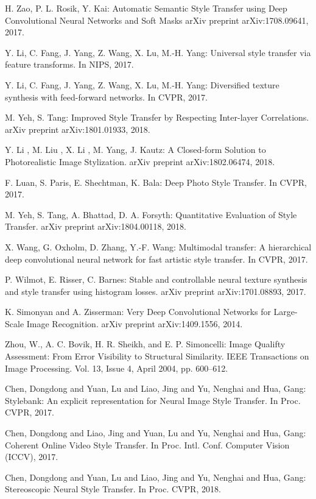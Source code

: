\documentclass{llncs}
\begin{document}
\begin{thebibliography}{5}
H. Zao, P. L. Rosik, Y. Kai:
Automatic Semantic Style Transfer using Deep Convolutional Neural Networks and Soft Masks
arXiv preprint arXiv:1708.09641, 2017.

Y. Li, C. Fang, J. Yang, Z. Wang, X. Lu, M.-H. Yang:
Universal style transfer via feature transforms.
In NIPS, 2017.

Y. Li, C. Fang, J. Yang, Z. Wang, X. Lu, M.-H. Yang:
Diversified texture synthesis with feed-forward networks.
In CVPR, 2017.

M. Yeh, S. Tang:
Improved Style Transfer by Respecting Inter-layer Correlations.
arXiv preprint arXiv:1801.01933, 2018.

Y. Li , M. Liu , X. Li , M. Yang, J. Kautz:
A Closed-form Solution to Photorealistic Image Stylization.
arXiv preprint arXiv:1802.06474, 2018.

F. Luan, S. Paris, E. Shechtman, K. Bala:
Deep Photo Style Transfer.
In CVPR, 2017.

M. Yeh, S. Tang, A. Bhattad, D. A. Forsyth:
Quantitative Evaluation of Style Transfer.
arXiv preprint arXiv:1804.00118, 2018.

 X. Wang, G. Oxholm, D. Zhang, Y.-F. Wang:
Multimodal transfer: A hierarchical deep convolutional neural network for fast artistic style transfer.
In CVPR, 2017.

 P. Wilmot, E. Risser, C. Barnes:
Stable and controllable neural texture synthesis and style transfer using histogram losses.
arXiv preprint arXiv:1701.08893, 2017.

 K. Simonyan and A. Zisserman:
Very Deep Convolutional Networks for Large-Scale Image Recognition.
arXiv preprint arXiv:1409.1556, 2014.

 Zhou, W., A. C. Bovik, H. R. Sheikh, and E. P. Simoncelli: 
Image Qualifty Assessment: From Error Visibility to Structural Similarity.
IEEE Transactions on Image Processing. Vol. 13, Issue 4, April 2004, pp. 600–612.

 Chen, Dongdong and Yuan, Lu and Liao, Jing and Yu, Nenghai and Hua, Gang: Stylebank: An explicit representation for Neural Image Style Transfer. In Proc. CVPR, 2017.

 Chen, Dongdong and Liao, Jing and Yuan, Lu and Yu, Nenghai and Hua, Gang: Coherent Online Video Style Transfer. In Proc. Intl. Conf. Computer Vision (ICCV), 2017.

 Chen, Dongdong and Yuan, Lu and Liao, Jing and Yu, Nenghai and Hua, Gang: Stereoscopic Neural Style Transfer. In Proc. CVPR, 2018.

\end{thebibliography}
\end{document}
